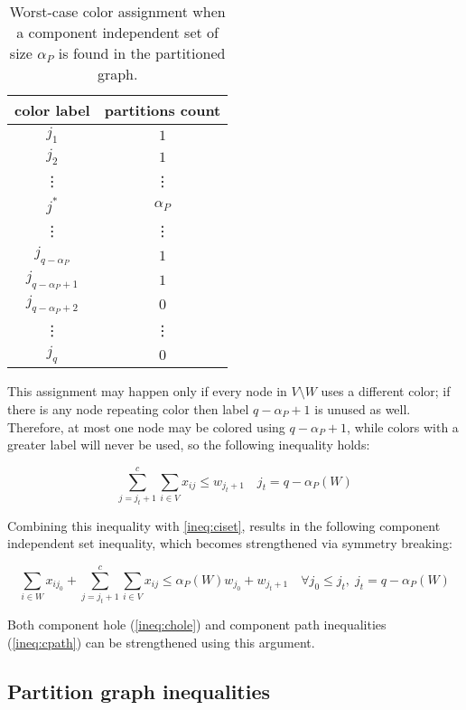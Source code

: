 \begin{table}
\centering	
\begin{tabular}{cc}
\hline
\textbf{color label} & \textbf{partitions count} \\
\hline
$j_1$ & $1$\\
$j_2$ & $1$\\
\vdots & \vdots \\
$j^*$ & $\alpha_P$ \\
\vdots & \vdots \\
$j_{q - \alpha_P}$ & $1$\\
$j_{q - \alpha_P + 1}$ & $1$\\
$j_{q - \alpha_P + 2}$ & $0$\\
\vdots & \vdots \\
$j_{q}$ & $0$\\
\hline
\end{tabular}
\caption{Worst-case color assignment when a component independent set of size $\alpha_P$ is found in the partitioned graph.}
	\label{table:cisetcoloring}
\end{table}

This assignment may happen only if every node in $V \setminus W$ uses a different color; if there is any node repeating color then label $q - \alpha_P + 1$ is unused as well. Therefore, at most one node may be colored using $q - \alpha_P + 1$, while colors with a greater label will never be used, so the following inequality holds:

\begin{equation}
\label{ineq:cisetbshigh}
\sum ^c _{j = j_t + 1} \sum _{i \in V} x_{ij} \leq w_{j_t + 1} \quad j_t = q - \alpha_P(W)
\end{equation}

Combining this inequality with \ref{ineq:ciset}, results in the following component independent set inequality, which becomes strengthened via symmetry breaking:

\begin{equation}
\label{ineq:cisetbs}
\sum_{i \in W} x_{ij_0} + \sum ^c _{j = j_t + 1} \sum _{i \in V} x_{ij} \leq \alpha_P(W) w_{j_0} + w_{j_t + 1} \quad \forall j_0 \leq j_t, \; j_t = q - \alpha_P(W)
\end{equation}

Both component hole (\ref{ineq:chole}) and component path inequalities (\ref{ineq:cpath}) can be strengthened using this argument.

\subsection{Partition graph inequalities}

